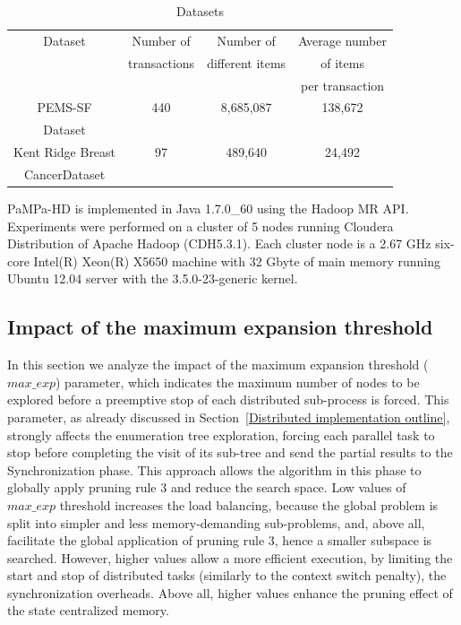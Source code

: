 \begin{table}[h!]
\begin{center}
\caption{Datasets}
\label{datasets}
\begin{tabular}{|c|c|c|c|}
\hline
	Dataset & Number of  & Number of & Average number  \\
	 & transactions &different items & of items  \\ 
	  &  & &  per transaction  \\ \hline
	
PEMS-SF    & 440& 8,685,087     & 138,672 \\
       Dataset      &  &          &  \\ \hline
     Kent Ridge Breast    & 97 & 489,640    & 24,492 \\
     CancerDataset      &    &            &  \\ \hline
\end{tabular}
\end{center}
\end{table}


PaMPa-HD is implemented in Java 1.7.0\_60 using the Hadoop MR API.
Experiments were performed on a cluster of 5 nodes running Cloudera
Distribution of Apache Hadoop (CDH5.3.1).
Each cluster node is a 2.67 GHz six-core Intel(R) Xeon(R) X5650 machine
with 32 Gbyte of main memory
running Ubuntu 12.04 server with the 3.5.0-23-generic kernel.


\subsection{Impact of the maximum expansion threshold}\label{exp_fisso}
In this section we analyze the impact of the maximum expansion threshold
($max\_exp$) parameter, which indicates the maximum number of nodes 
to be explored before a preemptive stop of each distributed sub-process is forced.
This parameter, as already discussed in Section~\ref{Distributed implementation outline},
strongly affects the enumeration tree exploration,
forcing each parallel task to stop before completing the visit of its sub-tree 
and send the partial results to the Synchronization phase. 
This approach allows the algorithm in this phase to globally apply 
pruning rule 3 and reduce the search space.
Low values of $max\_exp$ threshold increases the load balancing, 
because the global problem is split into simpler and less memory-demanding
sub-problems, and, above all, facilitate the global application of pruning rule 3, 
hence a smaller subspace is searched.
However, higher values allow a more efficient execution,
by limiting the start and stop of distributed tasks
(similarly to the context switch penalty), the synchronization overheads. Above all, higher values enhance the pruning effect of the state centralized memory.

